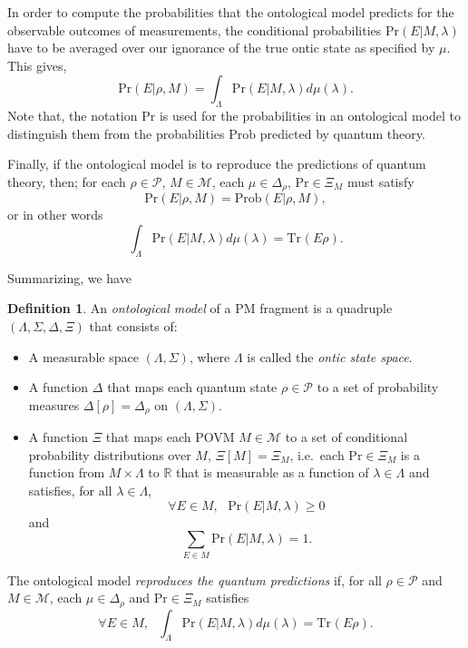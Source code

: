 \documentclass[DIV=calc,fontsize=12pt]{scrartcl} %
\theoremstyle{definition}
\newtheorem{definition}{Definition}[section]
\theoremstyle{plain}
\newcommand{\Tr}[2][]{\ensuremath{\text{Tr}_{#1} \left ( #2 \right )}}
\begin{document}
In order to compute the probabilities that the ontological model
predicts for the observable outcomes of measurements, the conditional
probabilities $\text{Pr}(E|M,\lambda)$ have to be averaged over our
ignorance of the true ontic state as specified by $\mu$.  This
gives,
\begin{equation}
\text{Pr}(E|\rho,M) = \int_{\Lambda} \text{Pr}(E|M,\lambda)
d\mu(\lambda).
\end{equation}
Note that, the notation $\text{Pr}$ is used for the probabilities in
an ontological model to distinguish them from the probabilities
$\text{Prob}$ predicted by quantum theory.

Finally, if the ontological model is to reproduce the predictions of
quantum theory, then; for each $\rho \in \mathcal{P}$, $M \in
\mathcal{M}$, each $\mu \in \Delta_{\rho}$, $\text{Pr} \in \Xi_M$ must
satisfy
\begin{equation}
\label{eq:Form:Rep}
\text{Pr}(E|\rho,M) = \text{Prob}(E|\rho,M),
\end{equation}
or in other words
\begin{equation}
\label{eq:Form:RepQ}
\int_{\Lambda} \text{Pr}(E|M,\lambda) d\mu(\lambda) = \Tr{E \rho}.
\end{equation}

Summarizing, we have
\begin{definition}
\label{def:Form:OM}
An \emph{ontological model} of a PM fragment is a
quadruple $(\Lambda, \Sigma, \Delta, \Xi)$ that consists of:
\begin{itemize}
\item A measurable space $(\Lambda, \Sigma)$, where $\Lambda$ is
called the \emph{ontic state space}.
\item A function $\Delta$ that maps each quantum state $\rho \in
\mathcal{P}$ to a set of probability measures $\Delta[\rho] =
\Delta_{\rho}$ on $(\Lambda,\Sigma)$.
\item A function $\Xi$ that maps each POVM $M \in \mathcal{M}$ to a
set of conditional probability distributions over $M$, $\Xi[M] =
\Xi_M$, i.e.\ each $\text{Pr} \in \Xi_M$ is a function from $M
\times \Lambda$ to $\mathbb{R}$ that is measurable as a function
of $\lambda \in \Lambda$ and satisfies, for all $\lambda \in
\Lambda$,
\begin{equation}
\forall E \in M, \,\,\,\, \text{Pr}(E|M,\lambda) \geq 0
\end{equation}
and
\begin{equation}
\sum_{E \in M} \text{Pr}(E|M,\lambda) = 1.
\end{equation}
\end{itemize}

The ontological model \emph{reproduces the quantum predictions} if,
for all $\rho \in \mathcal{P}$ and $M \in \mathcal{M}$, each $\mu
\in \Delta_{\rho}$ and $\text{Pr} \in \Xi_M$ satisfies
\begin{equation}
\label{eq:Form:Rep2}
\forall E \in M, \,\,\,\, \int_{\Lambda} \text{Pr}(E|M,\lambda) d
\mu(\lambda) = \Tr{E \rho}.
\end{equation}
\end{definition}
\end{document}

